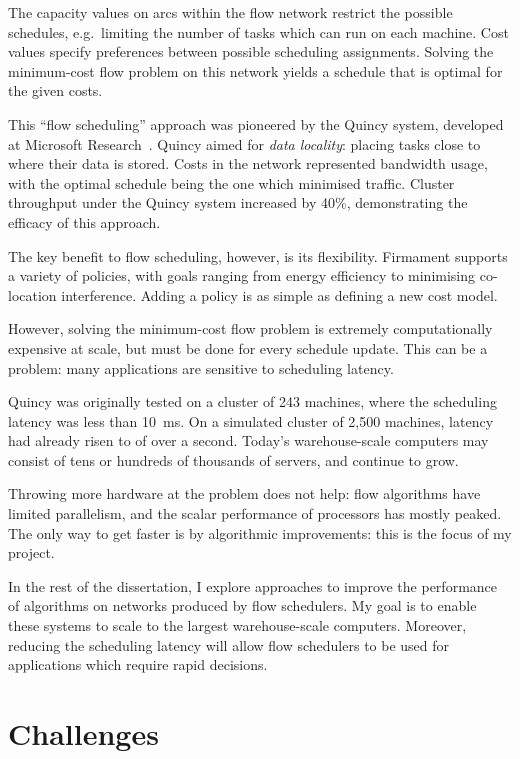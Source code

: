The capacity values on arcs within the flow network restrict the possible schedules, e.g.\ limiting the number of tasks which can run on each machine. Cost values specify preferences between possible scheduling assignments. Solving the minimum-cost flow problem on this network yields a schedule that is optimal for the given costs.

This ``flow scheduling'' approach was pioneered by the Quincy system, developed at Microsoft Research~\cite{Isard:2009}. Quincy aimed for \emph{data locality}: placing tasks close to where their data is stored. Costs in the network represented bandwidth usage, with the optimal schedule being the one which minimised traffic. Cluster throughput under the Quincy system increased by 40\%, demonstrating the efficacy of this approach.

The key benefit to flow scheduling, however, is its flexibility. Firmament supports a variety of policies, with goals ranging from energy efficiency to minimising co-location interference. Adding a policy is as simple as defining a new cost model.

However, solving the minimum-cost flow problem is extremely computationally expensive at scale, but must be done for every schedule update. This can be a problem: many applications are sensitive to scheduling latency.

Quincy was originally tested on a cluster of 243 machines, where the scheduling latency was less than \SI{10}{\milli\second}. On a simulated cluster of 2,500 machines, latency had already risen to of over a second. Today's warehouse-scale computers may consist of tens or hundreds of thousands of servers, and continue to grow.

Throwing more hardware at the problem does not help: flow algorithms have limited parallelism, and the scalar performance of processors has mostly peaked. The only way to get faster is by algorithmic improvements: this is the focus of my project.

In the rest of the dissertation, I explore approaches to improve the performance of algorithms on networks produced by flow schedulers. My goal is to enable these systems to scale to the largest warehouse-scale computers. Moreover, reducing the scheduling latency will allow flow schedulers to be used for applications which require rapid decisions.

\section{Challenges} \label{sec:intro-challenges}

